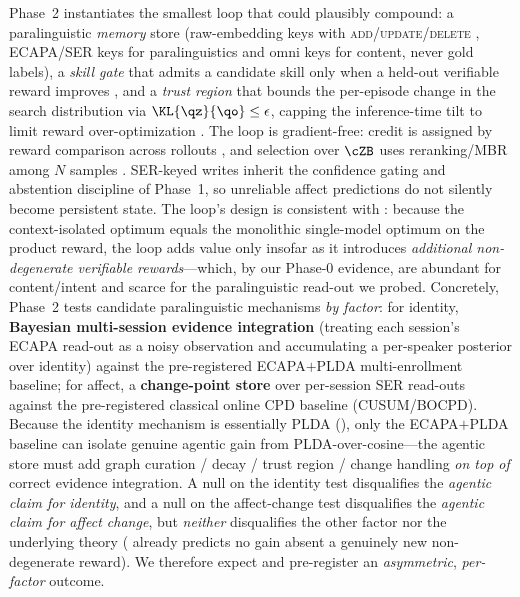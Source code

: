 Phase~2 instantiates the smallest loop that could plausibly compound: a paralinguistic \emph{memory} store (raw-embedding keys with \textsc{add}/\textsc{update}/\textsc{delete} \citealp{mem0_2025,memoryos2025}, ECAPA/SER keys for paralinguistics and omni keys for content, never gold labels), a \emph{skill gate} that admits a candidate skill only when a held-out verifiable reward improves \citep{skillsbench2026,coevoskills2026}, and a \emph{trust region} that bounds the per-episode change in the search distribution via $\KL{\qz}{\qo} \le \epsilon$, capping the inference-time tilt to limit reward over-optimization \citep{gao2023overopt,skalse2022rewardhacking}. The loop is gradient-free: credit is assigned by reward comparison across rollouts \citep{jitrl2026,ahmadian2024rloo}, and selection over $\cZB$ uses reranking/MBR among $N$ samples \citep{ichihara2025mbr,mbrasr2025}. SER-keyed writes inherit the confidence gating and abstention discipline of Phase~1, so unreliable affect predictions do not silently become persistent state. The loop's design is consistent with : because the context-isolated optimum equals the monolithic single-model optimum on the product reward, the loop adds value only insofar as it introduces \emph{additional non-degenerate verifiable rewards}---which, by our Phase-0 evidence, are abundant for content/intent and scarce for the paralinguistic read-out we probed. Concretely, Phase~2 tests candidate paralinguistic mechanisms \emph{by factor}: for identity, \textbf{Bayesian multi-session evidence integration} (treating each session's ECAPA read-out as a noisy observation and accumulating a per-speaker posterior over identity) against the pre-registered ECAPA$+$PLDA multi-enrollment baseline; for affect, a \textbf{change-point store} over per-session SER read-outs against the pre-registered classical online CPD baseline (CUSUM/BOCPD). Because the identity mechanism is essentially PLDA (), only the ECAPA$+$PLDA baseline can isolate genuine agentic gain from PLDA-over-cosine---the agentic store must add graph curation / decay / trust region / change handling \emph{on top of} correct evidence integration. A null on the identity test disqualifies the \emph{agentic claim for identity}, and a null on the affect-change test disqualifies the \emph{agentic claim for affect change}, but \emph{neither} disqualifies the other factor nor the underlying theory ( already predicts no gain absent a genuinely new non-degenerate reward). We therefore expect and pre-register an \emph{asymmetric}, \emph{per-factor} outcome.

